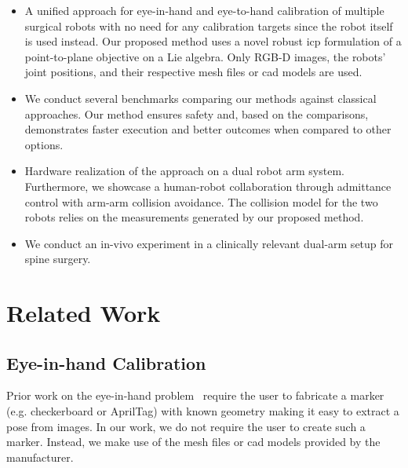\begin{itemize}
    \item A unified approach for eye-in-hand and eye-to-hand calibration of multiple surgical robots with no need for any calibration targets since the robot itself is used instead. Our proposed method uses a novel robust \acrfull{icp} formulation of a point-to-plane objective on a Lie algebra. Only RGB-D images, the robots' joint positions, and their respective mesh files or \acrshort{cad} models are used.
    \item We conduct several benchmarks comparing our methods against classical approaches. Our method ensures safety and, based on the comparisons, demonstrates faster execution and better outcomes when compared to other options.
    \item Hardware realization of the approach on a dual robot arm system. Furthermore, we showcase a human-robot collaboration through admittance control with arm-arm collision avoidance. The collision model for the two robots relies on the measurements generated by our proposed method.
    \item We conduct an in-vivo experiment in a clinically relevant dual-arm setup for spine surgery.
\end{itemize}




\section{Related Work}
\subsection{Eye-in-hand Calibration}
Prior work on the eye-in-hand problem~\cite{Horaud95, Strobl06} require the user to fabricate a marker (e.g. checkerboard or AprilTag\cite{Olson11}) with known geometry making it easy to extract a pose from images. In our work, we do not require the user to create such a marker.
Instead, we make use of the mesh files or \acrshort{cad} models provided by the manufacturer.

